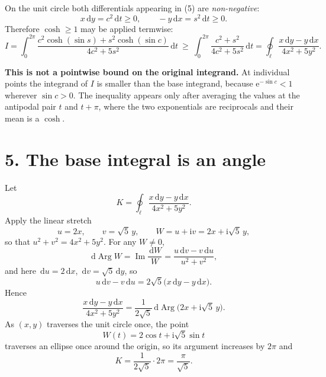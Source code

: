 \documentclass[12pt]{article}
\newcommand{\dd}{\,\mathrm{d}}
\newcommand{\ii}{\mathrm{i}}
\newcommand{\e}{\mathrm{e}}
\newcommand{\Arg}{\operatorname{Arg}}
\newcommand{\Ip}{\operatorname{Im}}
\newcommand{\lc}{\ell}
\begin{document}
On the unit circle both differentials appearing in (5) are
\emph{non-negative}:
\[
x\dd y=c^2\dd t\ge0,
\qquad
-y\dd x=s^2\dd t\ge0 .
\]
Therefore \(\cosh\ge1\) may be applied termwise:
\[
I=\int_0^{2\pi}\frac{c^2\cosh(\sin s)+s^2\cosh(\sin c)}{4c^2+5s^2}\dd t
\ \ge\
\int_0^{2\pi}\frac{c^2+s^2}{4c^2+5s^2}\dd t
=\oint_{\lc}\frac{x\dd y-y\dd x}{4x^2+5y^2}.
\tag{6}
\]

\textbf{This is not a pointwise bound on the original integrand.} At
individual points the integrand of \(I\) is smaller than the base
integrand, because \(\e^{-\sin c}<1\) wherever \(\sin c>0\). The
inequality appears only after averaging the values at the antipodal pair
\(t\) and \(t+\pi\), where the two exponentials are reciprocals and their
mean is a \(\cosh\).

\section*{5. The base integral is an angle}

Let
\[
K=\oint_{\lc}\frac{x\dd y-y\dd x}{4x^2+5y^2}.
\]
Apply the linear stretch
\[
u=2x,\qquad v=\sqrt5\,y,\qquad W=u+\ii v=2x+\ii\sqrt5\,y,
\]
so that \(u^2+v^2=4x^2+5y^2\). For any \(W\ne0\),
\[
\dd\Arg W=\Ip\frac{\dd W}{W}=\frac{u\dd v-v\dd u}{u^2+v^2},
\]
and here \(\dd u=2\dd x\), \(\dd v=\sqrt5\dd y\), so
\[
u\dd v-v\dd u=2\sqrt5\bigl(x\dd y-y\dd x\bigr).
\]
Hence
\[
\boxed{\displaystyle
\frac{x\dd y-y\dd x}{4x^2+5y^2}
=\frac1{2\sqrt5}\dd\Arg\bigl(2x+\ii\sqrt5\,y\bigr).}
\tag{7}
\]
As \((x,y)\) traverses the unit circle once, the point
\[
W(t)=2\cos t+\ii\sqrt5\sin t
\]
traverses an ellipse once around the origin, so its argument increases by
\(2\pi\) and
\[
K=\frac{1}{2\sqrt5}\cdot2\pi=\frac{\pi}{\sqrt5}.
\tag{8}
\]

\begin{center}
\end{center}
\end{document}
